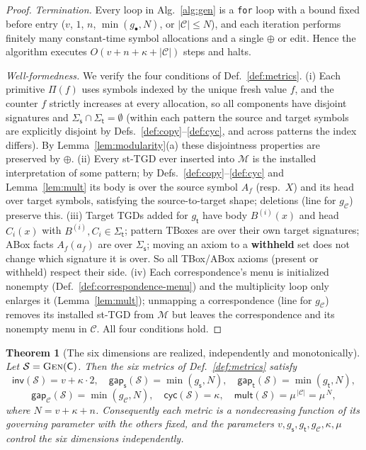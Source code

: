\documentclass{amsart}
\newtheorem{theorem}{Theorem}
\theoremstyle{definition}
\newcommand{\Sig}{\Sigma}
\newcommand{\Map}{\mathcal{M}}
\newcommand{\src}{\mathsf{s}}
\newcommand{\trg}{\mathsf{t}}
\newcommand{\Scn}{\mathcal{S}}
\newcommand{\Cfg}{\mathsf{C}}
\newcommand{\Cor}{\mathcal{C}}
\begin{document}
\begin{proof}
\emph{Termination.} Every loop in Alg.~\ref{alg:gen} is a \texttt{for} loop with
a bound fixed before entry ($v$, $1$, $n$, $\min(g_\bullet,N)$, or $|\Cor|\le N$),
and each iteration performs finitely many constant-time symbol allocations and a
single $\oplus$ or edit. Hence the algorithm executes $O(v+n+\kappa+|\Cor|)$
steps and halts.

\emph{Well-formedness.} We verify the four conditions of
Def.~\ref{def:metrics}. (i) Each primitive $\Pi(f)$ uses symbols indexed by the
unique fresh value $f$, and the counter $f$ strictly increases at every
allocation, so all components have disjoint signatures and
$\Sig_\src\cap\Sig_\trg=\emptyset$ (within each pattern the source and target
symbols are explicitly disjoint by Defs.~\ref{def:copy}--\ref{def:cyc}, and
across patterns the index differs). By Lemma~\ref{lem:modularity}(a) these
disjointness properties are preserved by $\oplus$.
(ii) Every st-TGD ever inserted into $\Map$ is the installed interpretation of
some pattern; by Defs.~\ref{def:copy}--\ref{def:cyc} and
Lemma~\ref{lem:mult} its body is over the source symbol $A_f$ (resp.\ $X$) and
its head over target symbols, satisfying the source-to-target shape; deletions
(line for $g_\Cor$) preserve this.
(iii) Target TGDs added for $g_\trg$ have body $B^{(i)}(x)$ and head $C_i(x)$
with $B^{(i)},C_i\in\Sig_\trg$; pattern TBoxes are over their own target
signatures; ABox facts $A_f(a_f)$ are over $\Sig_\src$; moving an axiom to a
\textbf{withheld} set does not change which signature it is over. So all
TBox/ABox axioms (present or withheld) respect their side.
(iv) Each correspondence's menu is initialized nonempty
(Def.~\ref{def:correspondence-menu}) and the multiplicity loop only enlarges it
(Lemma~\ref{lem:mult}); unmapping a correspondence (line for $g_\Cor$) removes
its installed st-TGD from $\Map$ but leaves the correspondence and its nonempty
menu in $\Cor$. All four conditions hold.
\end{proof}

\begin{theorem}[The six dimensions are realized, independently and monotonically]
\label{thm:dimensions}
Let $\Scn=\textsc{Gen}(\Cfg)$. Then the six metrics of
Def.~\ref{def:metrics} satisfy
\[
\mathsf{inv}(\Scn)=v+\kappa\cdot 2,\quad
\mathsf{gap}_\src(\Scn)=\min(g_\src,N),\quad
\mathsf{gap}_\trg(\Scn)=\min(g_\trg,N),
\]
\[
\mathsf{gap}_\Cor(\Scn)=\min(g_\Cor,N),\quad
\mathsf{cyc}(\Scn)=\kappa,\quad
\mathsf{mult}(\Scn)=\mu^{\,|\Cor|}=\mu^{\,N},
\]
where $N=v+\kappa+n$. Consequently each metric is a nondecreasing function of its
governing parameter with the others fixed, and the parameters
$v,g_\src,g_\trg,g_\Cor,\kappa,\mu$ control the six dimensions independently.
\end{theorem}
\end{document}
